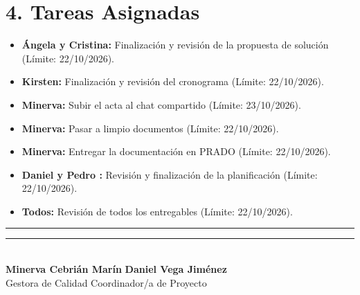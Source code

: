 \section*{4. Tareas Asignadas}
\begin{itemize}
    \item \textbf{Ángela y Cristina:} Finalización y revisión de la propuesta de solución (Límite: 22/10/2026).
     \item \textbf{Kirsten:} Finalización y revisión del cronograma (Límite: 22/10/2026).
    \item \textbf{Minerva:} Subir el acta al chat compartido (Límite: 23/10/2026).
    \item \textbf{Minerva:} Pasar a limpio documentos (Límite: 22/10/2026).
    \item \textbf{Minerva:} Entregar la documentación en PRADO (Límite: 22/10/2026).
     \item \textbf{Daniel y Pedro :} Revisión y finalización de la planificación (Límite: 22/10/2026).
    \item \textbf{Todos:} Revisión de todos los entregables (Límite: 22/10/2026).
\end{itemize}

\noindent
\rule{6cm}{0.4pt} \hfill \rule{6cm}{0.4pt}\\
\textbf{Minerva Cebrián Marín} \hfill \textbf{Daniel Vega Jiménez}\\
Gestora de Calidad \hfill Coordinador/a de Proyecto

